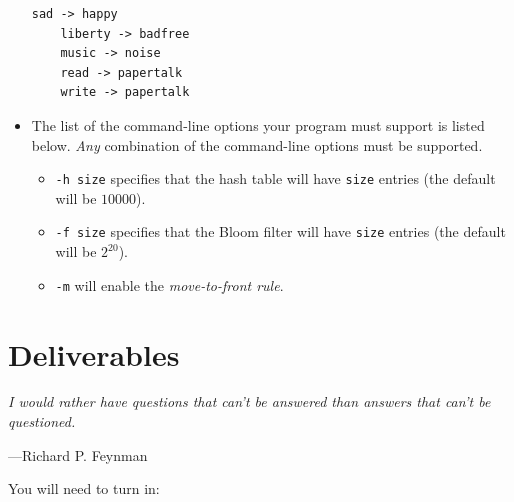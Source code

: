 \documentclass{article}
\begin{document}
\begin{itemize}
\begin{lstlisting}[style=plainstyle]
    sad -> happy
    liberty -> badfree
    music -> noise
    read -> papertalk
    write -> papertalk\end{lstlisting}

  \item The list of the command-line options your program must support
    is listed below. \emph{Any} combination of the command-line options
    must be supported.
    \begin{itemize}
      \item \texttt{-h size} specifies that the hash table
        will have \texttt{size} entries (the default will be $10000$).
      \item \texttt{-f size} specifies that the Bloom filter
        will have \texttt{size} entries (the default will be $2^{20}$).
      \item \texttt{-m} will enable the \emph{move-to-front rule}.
    \end{itemize}
\end{itemize}


\section{Deliverables}

\epigraph{\emph{I would rather have questions that can't be answered than
answers that can't be questioned.}}{---Richard P. Feynman}

You will need to turn in:
\end{document}
